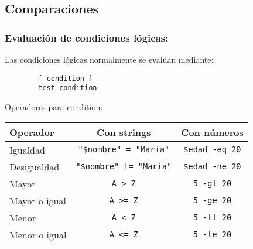 \subsection{Comparaciones}
\begin{frame}[fragile]
	\frametitle{Evaluación de condiciones lógicas:}
	Las condiciones lógicas normalmente se evalúan mediante:
	\begin{lstlisting}
		[ condition ]
		test condition
	\end{lstlisting}
	Operadores para condition:
	\begin{tabular}{|l|c|c|}
		\hline
		\textbf{Operador} & \textbf{Con strings} & \textbf{Con números} \\ \hline
		Igualdad & \verb+"$nombre" = "Maria"+ & \verb+$edad -eq 20+ \\ \hline
		Desigualdad & \verb+"$nombre" != "Maria"+ & \verb+$edad -ne 20+ \\ \hline
		Mayor & \verb+A > Z+ & \verb+5 -gt 20+ \\ \hline
		Mayor o igual & \verb+A >= Z+ & \verb+5 -ge 20+ \\ \hline
		Menor & \verb+A < Z+ & \verb+5 -lt 20+ \\ \hline
		Menor o igual & \verb+A <= Z+ & \verb+5 -le 20+ \\ \hline
	\end{tabular}

\end{frame}
